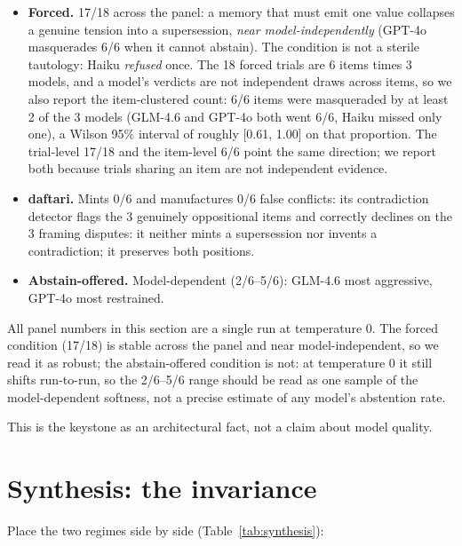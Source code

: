 \documentclass[11pt]{article}
\begin{document}
\begin{itemize}
\item \textbf{Forced.} 17/18 across the panel: a memory that must emit one value collapses a genuine
  tension into a supersession, \emph{near model-independently} (GPT-4o masquerades 6/6 when it
  cannot abstain). The condition is not a sterile tautology: Haiku \emph{refused} once. The 18 forced trials are 6
  items times 3 models, and a model's verdicts are not independent draws across items, so we
  also report the item-clustered count: 6/6 items were masqueraded by at least 2 of the 3
  models (GLM-4.6 and GPT-4o both went 6/6, Haiku missed only one), a Wilson 95\% interval of
  roughly [0.61, 1.00] on that proportion. The trial-level 17/18 and the item-level 6/6 point
  the same direction; we report both because trials sharing an item are not independent
  evidence.
\item \textbf{daftari.} Mints 0/6 and manufactures 0/6 false conflicts: its contradiction detector
  flags the 3 genuinely oppositional items and correctly declines on the 3 framing disputes:
  it neither mints a supersession nor invents a contradiction; it preserves both positions.
\item \textbf{Abstain-offered.} Model-dependent (2/6--5/6): GLM-4.6 most aggressive, GPT-4o most
  restrained.
\end{itemize}

All panel numbers in this section are a single run at temperature 0. The forced condition
(17/18) is stable across the panel and near model-independent, so we read it as robust; the
abstain-offered condition is not: at temperature 0 it still shifts run-to-run, so the 2/6--5/6
range should be read as one sample of the model-dependent softness, not a precise estimate of
any model's abstention rate.

This is the keystone as an architectural fact, not a claim about model quality.

\section{Synthesis: the invariance}
\label{sec:synthesis}

Place the two regimes side by side (Table~\ref{tab:synthesis}):
\end{document}
